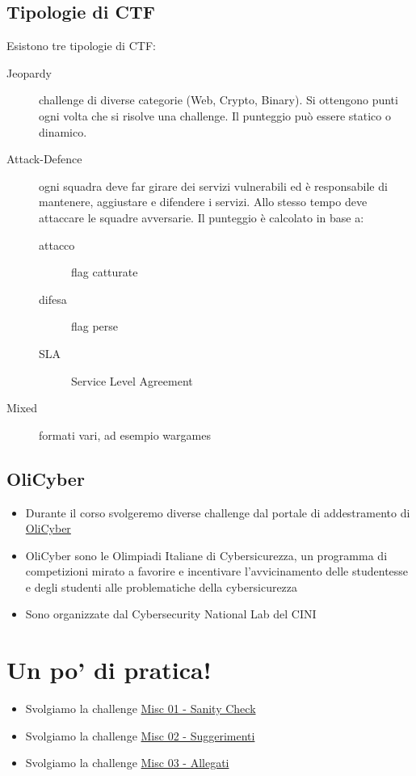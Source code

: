 \documentclass{beamer}
\begin{document}
\subsection*{Tipologie di CTF}
\begin{frame}{\insertsection}{\insertsubsection}
Esistono tre tipologie di CTF:
\begin{description}
\item[Jeopardy] challenge di diverse categorie (Web, Crypto, Binary). Si
ottengono punti ogni volta che si risolve una challenge. Il punteggio
può essere statico o dinamico.
\item[Attack-Defence] ogni squadra deve far girare dei servizi vulnerabili ed è
responsabile di mantenere, aggiustare e difendere i servizi. Allo stesso tempo
deve attaccare le squadre avversarie. Il punteggio è calcolato in base a:
\begin{description}
\item[attacco] flag catturate
\item[difesa] flag perse
\item[SLA] Service Level Agreement
\end{description}
\item[Mixed] formati vari, ad esempio wargames
\end{description}
\end{frame}

\subsection*{OliCyber}
\begin{frame}[allowframebreaks]{\insertsection}{\insertsubsection}
\begin{itemize}
\item Durante il corso svolgeremo diverse challenge dal portale di addestramento
di \alert{\href{https://training.olicyber.it}{OliCyber}}
\item \alert{OliCyber} sono le Olimpiadi Italiane di Cybersicurezza, un
programma di competizioni mirato a favorire e incentivare
l'avvicinamento delle studentesse e degli studenti alle
problematiche della cybersicurezza
\item Sono organizzate dal \alert{Cybersecurity National Lab} del \alert{CINI}
\end{itemize}
\end{frame}

\section{Un po' di pratica!}
\begin{frame}{\insertsection}
\begin{itemize}
\item Svolgiamo la challenge \href{https://training.olicyber.it/challenges\#challenge-248}{Misc 01 - Sanity Check}
\item Svolgiamo la challenge \href{https://training.olicyber.it/challenges\#challenge-249}{Misc 02 - Suggerimenti}
\item Svolgiamo la challenge \href{https://training.olicyber.it/challenges\#challenge-250}{Misc 03 - Allegati}
\end{itemize}
\end{frame}
\end{document}
